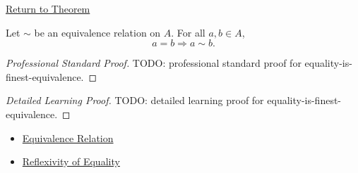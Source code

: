 \newpage
{}
\label{prf:equality-is-finest-equivalence}

\begin{remark*}[Return]
\hyperref[cor:equality-is-finest-equivalence]{Return to Theorem}
\end{remark*}

\begin{corollary*}
Let $\sim$ be an equivalence relation on $A$. For all $a,b\in A$,
\[
a=b \Longrightarrow a\sim b.
\]
\end{corollary*}

\begin{proof}[Professional Standard Proof]
\LRAProofBodyStart
TODO: professional standard proof for equality-is-finest-equivalence.
\end{proof}

\begin{proof}[Detailed Learning Proof]
\LRAProofBodyStart
TODO: detailed learning proof for equality-is-finest-equivalence.
\end{proof}

\begin{remark*}
\end{remark*}

\begin{dependencies}
\begin{itemize}
  \item \hyperref[def:equivalence-relation]{Equivalence Relation}
  \item \hyperref[ax:equality-reflexivity]{Reflexivity of Equality}
\end{itemize}
\end{dependencies}

\clearpage
